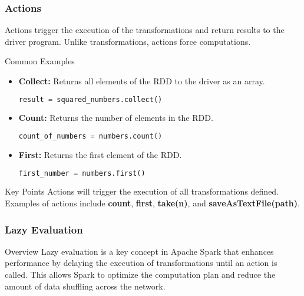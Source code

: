 \documentclass[aspectratio=169]{beamer}
\begin{document}
\begin{frame}[fragile]
    \frametitle{Actions}
    Actions trigger the execution of the transformations and return results to the driver program. Unlike transformations, actions force computations.

    \begin{block}{Common Examples}
        \begin{itemize}
            \item \textbf{Collect:} Returns all elements of the RDD to the driver as an array.
            \begin{lstlisting}[language=Python]
result = squared_numbers.collect()
            \end{lstlisting}
            
            \item \textbf{Count:} Returns the number of elements in the RDD.
            \begin{lstlisting}[language=Python]
count_of_numbers = numbers.count()
            \end{lstlisting}
            
            \item \textbf{First:} Returns the first element of the RDD.
            \begin{lstlisting}[language=Python]
first_number = numbers.first()
            \end{lstlisting}
        \end{itemize}
    \end{block}

    \begin{block}{Key Points}
        Actions will trigger the execution of all transformations defined. Examples of actions include \textbf{count}, \textbf{first}, \textbf{take(n)}, and \textbf{saveAsTextFile(path)}.
    \end{block}

\end{frame}

\begin{frame}
    \frametitle{Lazy Evaluation}
    \begin{block}{Overview}
        Lazy evaluation is a key concept in Apache Spark that enhances performance by delaying the execution of transformations until an action is called. This allows Spark to optimize the computation plan and reduce the amount of data shuffling across the network.
    \end{block}
\end{frame}
\end{document}
